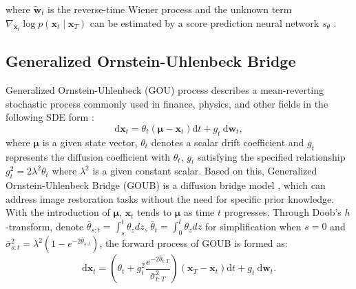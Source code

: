 where $\tilde{\mathbf{w}}_t$ is the reverse-time Wiener process and the unknown term $\nabla_{\mathbf{x}_t} \log p(\mathbf{x}_t \mid \mathbf{x}_T)$ can be estimated by a score prediction neural network $s_{\theta}$ \cite{song2021scorebasedgenerativemodelingstochastic}.
\subsection{Generalized Ornstein-Uhlenbeck Bridge}
Generalized Ornstein-Uhlenbeck (GOU) process describes a mean-reverting stochastic process commonly used in finance, physics, and other fields in the following SDE form \cite{ahmad1988introduction, Pavliotis2014, WANG2018921}:
\begin{equation}\label{gou_process}
\mathrm{d} \mathbf{x}_t=\theta_t\left(\boldsymbol{\mu}-\mathbf{x}_t\right) \mathrm{d} t+g_t \mathrm{~d} \mathbf{w}_t,
\end{equation}
where $\boldsymbol{\mu}$ is a given state vector, $\theta_t$ denotes a scalar drift coefficient and $g_t$ represents the diffusion coefficient with $\theta_t$, $g_t$ satisfying the specified relationship $g_{t}^{2} = 2 \lambda^2 \theta_t$ where $\lambda^2$ is a given constant scalar. Based on this, Generalized Ornstein-Uhlenbeck Bridge (GOUB) is a diffusion bridge model \cite{yue2024imagerestorationgeneralizedornsteinuhlenbeck}, which can address image restoration tasks without the need for specific prior knowledge. With the introduction of $\boldsymbol{\mu}$, $\mathbf{x}_t$ tends to $\boldsymbol{\mu}$ as time $t$ progresses. Through Doob's $h$-transform, denote $\bar{\theta}_{s:t} = \int_{s}^{t} \theta_z dz$, $\bar{\theta}_{t} = \int_{0}^{t} \theta_z dz$ for simplification when $s=0$ and $\bar{\sigma}^2_{s:t} = \lambda^2(1-e^{-2\bar{\theta}_{s:t}})$, the forward process of GOUB is formed as:
\begin{equation}\label{goub_forward_sde}
\mathrm{d} \mathbf{x}_t=\left(\theta_t+g_t^2 \frac{e^{-2 \bar{\theta}_{t: T}}}{\bar{\sigma}_{t: T}^2}\right)\left(\mathbf{x}_T-\mathbf{x}_t\right) \mathrm{d} t+g_t \mathrm{~d} \mathbf{w}_t.
\end{equation}
